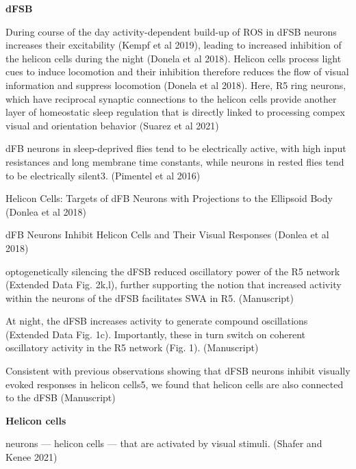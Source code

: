 \color{red}

\textbf{dFSB}

During course of the day activity-dependent build-up of ROS in dFSB neurons increases their excitability (Kempf et al 2019),
leading to increased inhibition of the helicon cells during the night (Donela et al 2018). Helicon cells process
light cues to induce locomotion and their inhibition therefore reduces the flow of visual information and
suppress locomotion (Donela et al 2018). Here, R5 ring neurons, which have reciprocal synaptic connections to the
helicon cells provide another layer of homeostatic sleep regulation that is directly linked to processing
compex visual and orientation behavior \parencite{suarez-grimaltNeuralArchitectureSleep2021}
(Suarez et al 2021)

dFB neurons in sleep-deprived flies tend to be electrically active, with high input resistances and long membrane time constants, while neurons in rested flies tend to be  electrically silent3.
\parencite{pimentelOperationHomeostaticSleep2016} (Pimentel et al 2016)

Helicon Cells: Targets of dFB Neurons with Projections to the Ellipsoid Body
\parencite{donleaRecurrentCircuitryBalancing2018} (Donlea et al 2018)

dFB Neurons Inhibit Helicon Cells and Their Visual Responses
\parencite{donleaRecurrentCircuitryBalancing2018} (Donlea et al 2018)

optogenetically silencing the dFSB reduced oscillatory
power of the R5 network (Extended Data Fig. 2k,l), further supporting the notion that
increased activity within the neurons of the dFSB facilitates SWA in R5. 
\parencite{raccugliaCoherentMultilevelNetwork2022} (Manuscript)

At night, the dFSB increases activity to generate compound
oscillations (Extended Data Fig. 1c). Importantly, these in turn switch on coherent oscillatory
activity in the R5 network (Fig. 1).
\parencite{raccugliaCoherentMultilevelNetwork2022} (Manuscript)

Consistent with previous
observations showing that dFSB neurons inhibit visually evoked responses in helicon cells5, we
found that helicon cells are also connected to the dFSB
\parencite{raccugliaCoherentMultilevelNetwork2022} (Manuscript)


\noindent\hrulefill

\textbf{Helicon cells}

neurons — helicon cells — that are activated by visual stimuli.
\parencite{shaferRegulationDrosophilaSleep2021} (Shafer and Kenee 2021)

